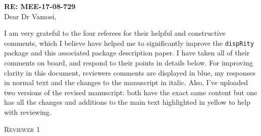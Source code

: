 \documentclass[12pt,letterpaper]{article}
\renewcommand{\section}[1]{%
\bigskip
\begin{center}
\begin{Large}
\normalfont\scshape #1
\medskip
\end{Large}
\end{center}}
\begin{document}
\textbf{RE: MEE-17-08-729 }\\
\bigskip
Dear Dr Vamosi,\\
\bigskip

I am very grateful to the four referees for their helpful and constructive comments, which I believe have helped me to significantly improve the \texttt{dispRity} package and this associated package description paper.
I have taken all of their comments on board, and respond to their points in details below.
For improving clarity in this document, reviewers comments are displayed in blue, my responses in normal text and the changes to the manuscript in italic.
Also, I've uploaded two versions of the revised manuscript: both have the exact same content but one has all the changes and additions to the main text highlighted in yellow to help with reviewing.

%
%


\section{Reviewer 1}
\end{document}
